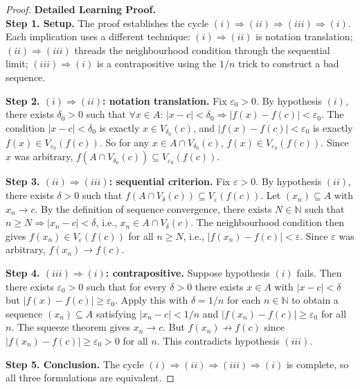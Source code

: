 \begin{proof}
\textbf{Detailed Learning Proof.}~\\

\textbf{Step 1. Setup.} The proof establishes the cycle $(i) \Rightarrow
(ii) \Rightarrow (iii) \Rightarrow (i)$. Each implication uses a
different technique: $(i) \Rightarrow (ii)$ is notation translation;
$(ii) \Rightarrow (iii)$ threads the neighbourhood condition through
the sequential limit; $(iii) \Rightarrow (i)$ is a contrapositive
using the $1/n$ trick to construct a bad sequence.

\textbf{Step 2. $(i) \Rightarrow (ii)$: notation translation.}
Fix $\varepsilon_0 > 0$. By hypothesis $(i)$, there exists $\delta_0 > 0$
such that $\forall x \in A$: $|x - c| < \delta_0 \Rightarrow |f(x) -
f(c)| < \varepsilon_0$. The condition $|x - c| < \delta_0$ is exactly
$x \in V_{\delta_0}(c)$, and $|f(x) - f(c)| < \varepsilon_0$ is exactly
$f(x) \in V_{\varepsilon_0}(f(c))$. So for any $x \in A \cap
V_{\delta_0}(c)$, $f(x) \in V_{\varepsilon_0}(f(c))$. Since $x$ was
arbitrary, $f(A \cap V_{\delta_0}(c)) \subseteq V_{\varepsilon_0}(f(c))$.

\textbf{Step 3. $(ii) \Rightarrow (iii)$: sequential criterion.}
Fix $\varepsilon > 0$. By hypothesis $(ii)$, there exists $\delta > 0$
such that $f(A \cap V_\delta(c)) \subseteq V_\varepsilon(f(c))$. Let
$(x_n) \subseteq A$ with $x_n \to c$. By the definition of sequence
convergence, there exists $N \in \mathbb{N}$ such that $n \geq N
\Rightarrow |x_n - c| < \delta$, i.e., $x_n \in A \cap V_\delta(c)$.
The neighbourhood condition then gives $f(x_n) \in V_\varepsilon(f(c))$
for all $n \geq N$, i.e., $|f(x_n) - f(c)| < \varepsilon$. Since
$\varepsilon$ was arbitrary, $f(x_n) \to f(c)$.

\textbf{Step 4. $(iii) \Rightarrow (i)$: contrapositive.}
Suppose hypothesis $(i)$ fails. Then there exists $\varepsilon_0 > 0$
such that for every $\delta > 0$ there exists $x \in A$ with $|x - c|
< \delta$ but $|f(x) - f(c)| \geq \varepsilon_0$. Apply this with
$\delta = 1/n$ for each $n \in \mathbb{N}$ to obtain a sequence
$(x_n) \subseteq A$ satisfying $|x_n - c| < 1/n$ and $|f(x_n) -
f(c)| \geq \varepsilon_0$ for all $n$. The squeeze theorem gives
$x_n \to c$. But $f(x_n) \not\to f(c)$ since $|f(x_n) - f(c)| \geq
\varepsilon_0 > 0$ for all $n$. This contradicts hypothesis $(iii)$.

\textbf{Step 5. Conclusion.} The cycle $(i) \Rightarrow (ii) \Rightarrow
(iii) \Rightarrow (i)$ is complete, so all three formulations are equivalent.
\end{proof}

